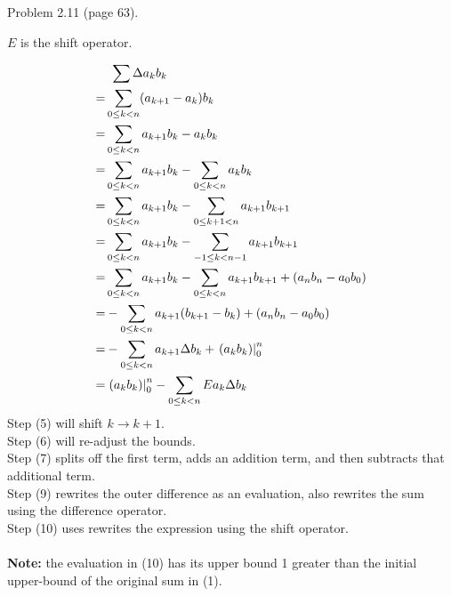 \documentclass[a4paper,12pt,fleqn]{article}
\begin{document}
Problem 2.11 (page 63).

$E$ is the shift operator.

\begin{align}
  & \hskip 4pt \sum \Delta a_k b_k\\
= & \sum_{0\leq k < n} (a_{k+1} - a_k)b_k \\
= & \sum_{0\leq k < n} a_{k+1} b_k - a_k b_k \\
= & \sum_{0\leq k < n} a_{k+1} b_k - \sum_{0\leq k < n} a_k b_k \\
= & \sum_{0\leq k < n} a_{k+1} b_k - \sum_{0\leq k+1 < n} a_{k+1} b_{k+1} \\
= & \sum_{0\leq k < n} a_{k+1} b_k - \sum_{-1\leq k < n-1} a_{k+1} b_{k+1} \\
= & \sum_{0\leq k < n} a_{k+1} b_k - \sum_{0\leq k < n} a_{k+1} b_{k+1} + (a_n b_n - a_0 b_0) \\
= & - \sum_{0\leq k < n} a_{k+1} (b_{k+1} - b_k) + (a_n b_n - a_0 b_0) \\
= & - \sum_{0\leq k < n} a_{k+1} \Delta b_{k} + \left.(a_k b_k)\right|_0^n  \\
= & \left.(a_k b_k)\right|_0^n - \sum_{0\leq k < n} E a_k \Delta b_{k} \\
\end{align}
%
Step (5) will shift $k \to k+1$. \\
Step (6) will re-adjust the bounds. \\
Step (7) splits off the first term, adds an addition term, and then subtracts that additional term. \\
Step (9) rewrites the outer difference as an evaluation, also rewrites the sum using the difference operator. \\
Step (10) uses rewrites the expression using the shift operator.\\
\\
\textbf{Note:} the evaluation in (10) has its upper bound 1 greater than the initial upper-bound of the original sum in (1).
\end{document}

